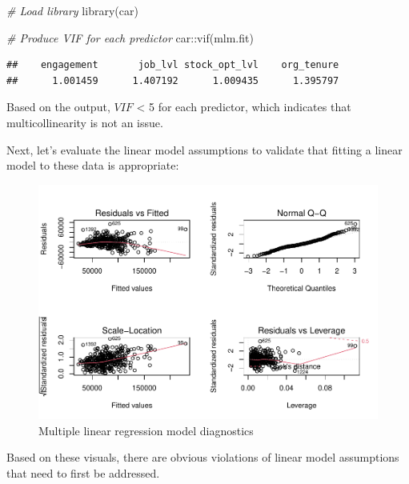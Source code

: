 \documentclass[
]{book}
\newenvironment{Shaded}{\begin{snugshade}}{\end{snugshade}}
\newcommand{\CommentTok}[1]{\textcolor[rgb]{0.56,0.35,0.01}{\textit{#1}}}
\newcommand{\FunctionTok}[1]{\textcolor[rgb]{0.00,0.00,0.00}{#1}}
\newcommand{\NormalTok}[1]{#1}
\newcommand{\SpecialCharTok}[1]{\textcolor[rgb]{0.00,0.00,0.00}{#1}}
\begin{document}
\begin{Shaded}
\begin{Highlighting}[]
\CommentTok{\# Load library}
\FunctionTok{library}\NormalTok{(car)}

\CommentTok{\# Produce VIF for each predictor}
\NormalTok{car}\SpecialCharTok{::}\FunctionTok{vif}\NormalTok{(mlm.fit)}
\end{Highlighting}
\end{Shaded}

\begin{verbatim}
##    engagement       job_lvl stock_opt_lvl    org_tenure 
##      1.001459      1.407192      1.009435      1.395797
\end{verbatim}

Based on the output, \(VIF\) \textless{} 5 for each predictor, which indicates that multicollinearity is not an issue.

Next, let's evaluate the linear model assumptions to validate that fitting a linear model to these data is appropriate:

\begin{figure}

{\centering \includegraphics[width=1\linewidth]{The_Fundamentals_of_People_Analytics_files/figure-latex/pre-mlm-diagnostics-1} 

}

\caption{Multiple linear regression model diagnostics}\label{fig:pre-mlm-diagnostics}
\end{figure}

Based on these visuals, there are obvious violations of linear model assumptions that need to first be addressed.
\end{document}
